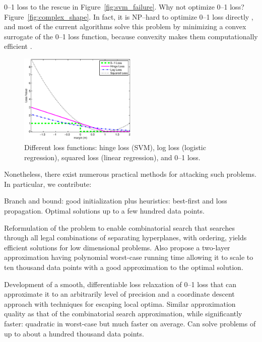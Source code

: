 0--1 loss to the rescue in Figure~\ref{fig:svm_failure}.  Why not
optimize 0--1 loss?  Figure~\ref{fig:complex_shape}.  In fact, it is
NP--hard to optimize 0--1 loss directly \cite{Feldman,nphard}, and
most of the current algorithms solve this problem by minimizing a
convex surrogate of the 0--1 loss function, because convexity makes
them computationally efficient \cite{Bartlett}.

\begin{figure}[t!]
\includegraphics[width=0.50\textwidth]{images/fig13_losses.eps}
\caption{ \footnotesize Different loss functions: hinge loss (SVM),
  log loss (logistic regression), squared loss (linear regression),
  and 0--1 loss.  }
\label{fig:losses}
\end{figure}

Nonetheless, there exist numerous practical methods for attacking
such problems.  In particular, we contribute:

Branch and bound: good initialization plus heuristics: best-first and
loss propagation.  Optimal solutions up to a few hundred data points.

Reformulation of the problem to enable combinatorial search that
searches through all legal combinations of separating hyperplanes,
with ordering, yields efficient solutions for low dimensional
problems.  Also propose a two-layer approximation having polynomial
worst-case running time allowing it to scale to ten thousand data
points with a good approximation to the optimal solution.

Development of a smooth, differentiable loss relaxation of 0--1 loss
that can approximate it to an arbitrarily level of precision and a
coordinate descent approach with techniques for escaping local
optima. Similar approximation quality as that of the combinatorial
search approximation, while significantly faster: quadratic in
worst-case but much faster on average.  Can solve problems of up to
about a hundred thousand data points.

